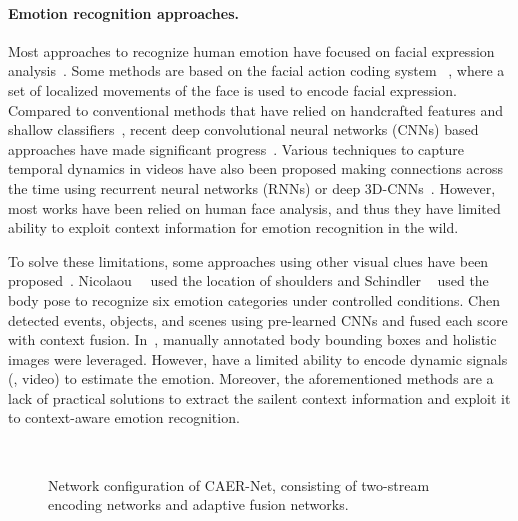 \documentclass[10pt,twocolumn,letterpaper]{article}
\begin{document}
\paragraph{Emotion recognition approaches.}\label{sec:21}
Most approaches to recognize human emotion have focused on facial expression analysis~\cite{shan2009facial,zhong2012learning,fabian2016emotionet,li2018occlusion,li2017reliable}. Some methods are based on the facial action coding system ~\cite{friesen1978facial,eleftheriadis2015discriminative}, where a set of localized movements of the face is used to encode facial expression.
Compared to conventional methods that have relied on handcrafted features and shallow classifiers~\cite{shan2009facial,zhong2012learning}, recent deep convolutional neural networks (CNNs) based approaches have made significant progress~\cite{fabian2016emotionet}.
Various techniques to capture temporal dynamics in videos have also been proposed making connections across the time using recurrent neural networks (RNNs) or deep 3D-CNNs~\cite{fan2016video,lee2018spatiotemporal}.
However, most works have been relied on human face analysis, and thus they have limited ability to exploit context information for emotion recognition in the wild.

To solve these limitations, some approaches using other visual clues have been proposed~\cite{nicolaou2011continuous, schindler2008recognizing, chen2016emotion, kosti2017emotion}.
Nicolaou~\etal~\cite{nicolaou2011continuous} used the location of shoulders and Schindler \etal~\cite{schindler2008recognizing} used the body pose to recognize six emotion categories under controlled conditions.
Chen \etal~\cite{chen2016emotion} detected events, objects, and scenes using pre-learned CNNs and fused each score with context fusion.
In~\cite{kosti2017emotion}, manually annotated body bounding boxes and holistic images were leveraged.
However, \cite{kosti2017emotion} have a limited ability to encode dynamic signals (\ie, video) to estimate the emotion.
Moreover, the aforementioned methods are a lack of practical solutions to extract the sailent context information and exploit it to context-aware emotion recognition.


\begin{figure*}
	\centering
	\renewcommand{\thesubfigure}{}
	\\
	\vspace{-10pt}
	\caption{Network configuration of CAER-Net, consisting of two-stream encoding networks and adaptive fusion networks.}
\label{fig:2}\vspace{-10pt}
\end{figure*}
\end{document}
